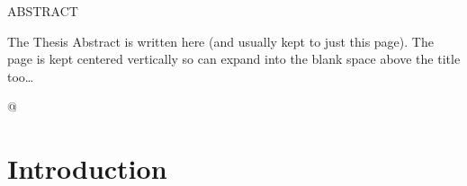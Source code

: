 \documentclass[
12pt, %
english, %
doublespacing, %
nolistspacing, %
liststotoc, %
headsepline, %
chapterinoneline, %
openany, %
]{DoctoralThesis}\usepackage[]{graphicx}\usepackage[]{color}
\begin{document}
%


\addchaptertocentry{\abstractname} %

\begin{center}
\MakeUppercase{Abstract}\\ \bigskip
\end{center}

The Thesis Abstract is written here (and usually kept to just this page). The page is kept centered vertically so can expand into the blank space above the title too\ldots





\pagestyle{thesis} %







@


\chapter{Introduction} %
\end{document}
